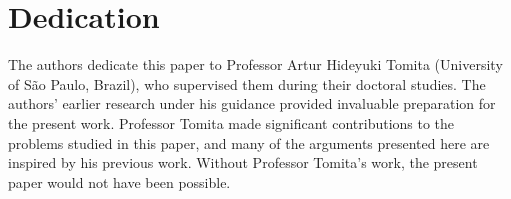 \documentclass[11pt]{amsart}
\theoremstyle{definition}
\begin{document}
\section*{Dedication}
The authors dedicate this paper to Professor Artur Hideyuki Tomita (University
of S\~ao Paulo, Brazil), who supervised them during their doctoral studies.
The authors' earlier research under his guidance provided invaluable preparation for the present work.
Professor Tomita made significant contributions to the problems studied in this paper, and many of the arguments presented here are inspired by his previous work.
Without Professor Tomita's work, the present paper would not have been
possible.




\end{document}
